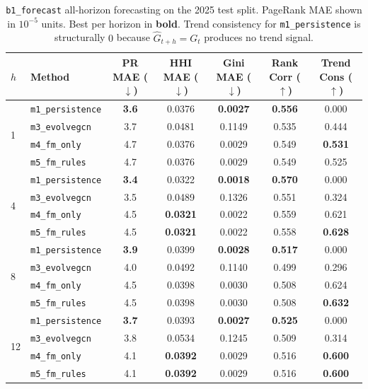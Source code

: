 \begin{table}[t]
\centering
\footnotesize
\setlength{\tabcolsep}{4pt}
\caption{\texttt{b1\_forecast} all-horizon forecasting on the 2025 test split.
PageRank MAE shown in $10^{-5}$ units. Best per horizon in \textbf{bold}.
Trend consistency for \texttt{m1\_persistence} is structurally $0$ because
$\hat G_{t+h}=G_t$ produces no trend signal.}
\label{tab:b1_all_horizons}
\begin{tabular}{l l c c c c c}
\toprule
$h$ & Method & PR MAE ($\downarrow$) & HHI MAE ($\downarrow$) & Gini MAE ($\downarrow$) & Rank Corr ($\uparrow$) & Trend Cons ($\uparrow$) \\
\midrule
\multirow{4}{*}{1}
& \texttt{m1\_persistence} & \textbf{3.6} & 0.0376 & \textbf{0.0027} & \textbf{0.556} & 0.000 \\
& \texttt{m3\_evolvegcn}   & 3.7          & 0.0481 & 0.1149          & 0.535          & 0.444 \\
& \texttt{m4\_fm\_only}    & 4.7          & 0.0376 & 0.0029          & 0.549          & \textbf{0.531} \\
& \texttt{m5\_fm\_rules}   & 4.7          & 0.0376 & 0.0029          & 0.549          & 0.525 \\
\midrule
\multirow{4}{*}{4}
& \texttt{m1\_persistence} & \textbf{3.4} & 0.0322 & \textbf{0.0018} & \textbf{0.570} & 0.000 \\
& \texttt{m3\_evolvegcn}   & 3.5          & 0.0489 & 0.1326          & 0.551          & 0.324 \\
& \texttt{m4\_fm\_only}    & 4.5          & \textbf{0.0321} & 0.0022 & 0.559          & 0.621 \\
& \texttt{m5\_fm\_rules}   & 4.5          & \textbf{0.0321} & 0.0022 & 0.558          & \textbf{0.628} \\
\midrule
\multirow{4}{*}{8}
& \texttt{m1\_persistence} & \textbf{3.9} & 0.0399 & \textbf{0.0028} & \textbf{0.517} & 0.000 \\
& \texttt{m3\_evolvegcn}   & 4.0          & 0.0492 & 0.1140          & 0.499          & 0.296 \\
& \texttt{m4\_fm\_only}    & 4.5          & 0.0398 & 0.0030          & 0.508          & 0.624 \\
& \texttt{m5\_fm\_rules}   & 4.5          & 0.0398 & 0.0030          & 0.508          & \textbf{0.632} \\
\midrule
\multirow{4}{*}{12}
& \texttt{m1\_persistence} & \textbf{3.7} & 0.0393 & \textbf{0.0027} & \textbf{0.525} & 0.000 \\
& \texttt{m3\_evolvegcn}   & 3.8          & 0.0534 & 0.1245          & 0.509          & 0.314 \\
& \texttt{m4\_fm\_only}    & 4.1          & \textbf{0.0392} & 0.0029 & 0.516          & \textbf{0.600} \\
& \texttt{m5\_fm\_rules}   & 4.1          & \textbf{0.0392} & 0.0029 & 0.516          & \textbf{0.600} \\
\bottomrule
\end{tabular}
\end{table}
